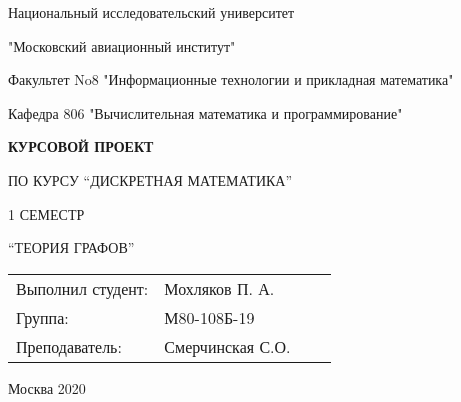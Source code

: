 {
\thispagestyle{empty}
\begin{center}
\large
Национальный исследовательский университет 

"Московский авиационный институт"

Факультет No8 "Информационные технологии и прикладная математика"

Кафедра 806 "Вычислительная математика и программирование"

\vspace{7cm}
{\bfseries
КУРСОВОЙ ПРОЕКТ

ПО КУРСУ “ДИСКРЕТНАЯ МАТЕМАТИКА”

1 СЕМЕСТР 

“ТЕОРИЯ ГРАФОВ”}

\vspace{9cm}
\end{center}
\begin{flushright}
\begin{tabular}{lp{4cm}lp{4cm}}
Выполнил студент: & Мохляков П. А.\\
Группа: & М80-108Б-19\\
Преподаватель: & Смерчинская С.О.\\
\end{tabular}
\end{flushright}
\vspace{2.2cm}
\begin{center}
Москва 2020
\end{center}
\newpage
}